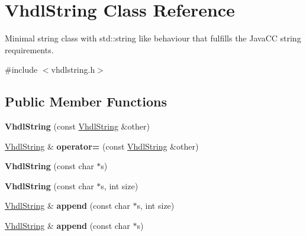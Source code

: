 \hypertarget{class_vhdl_string}{}\section{Vhdl\+String Class Reference}
\label{class_vhdl_string}


Minimal string class with std\+::string like behaviour that fulfills the Java\+CC string requirements.  




{\ttfamily \#include $<$vhdlstring.\+h$>$}

\subsection*{Public Member Functions}
\begin{DoxyCompactItemize}
\item 
\mbox{\label{class_vhdl_string_a8fe423bc361c8030dc9f6ba110d87141}} 
{\bfseries Vhdl\+String} (const \mbox{\hyperlink{class_vhdl_string}{Vhdl\+String}} \&other)
\item 
\mbox{\label{class_vhdl_string_ae3c975354c2e551238394e2966f15999}} 
\mbox{\hyperlink{class_vhdl_string}{Vhdl\+String}} \& {\bfseries operator=} (const \mbox{\hyperlink{class_vhdl_string}{Vhdl\+String}} \&other)
\item 
\mbox{\label{class_vhdl_string_ac1475e34a382d8691a23ac4e1d25e379}} 
{\bfseries Vhdl\+String} (const char $\ast$s)
\item 
\mbox{\label{class_vhdl_string_ab0fb86df3d26cfde46f9822599a53269}} 
{\bfseries Vhdl\+String} (const char $\ast$s, int size)
\item 
\mbox{\label{class_vhdl_string_afa4734698d424fe3aa51f828a4f52446}} 
\mbox{\hyperlink{class_vhdl_string}{Vhdl\+String}} \& {\bfseries append} (const char $\ast$s, int size)
\item 
\mbox{\label{class_vhdl_string_a2ccc401ac9c92eae61386019e9539cd6}} 
\mbox{\hyperlink{class_vhdl_string}{Vhdl\+String}} \& {\bfseries append} (const char $\ast$s)
\item 
\mbox{\label{class_vhdl_string_a1f11b119dfb6f63b4b77a6d272b6c0d3}} 

\end{DoxyCompactItemize}
